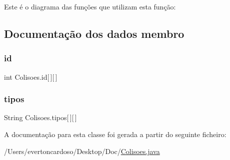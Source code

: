 Este é o diagrama das funções que utilizam esta função\+:


\subsection{Documentação dos dados membro}
\mbox{\label{class_colisoes_a24e82ed4cd735cdf7adc0e1dfe1da0d4}} 
\subsubsection{\texorpdfstring{id}{id}}
{\footnotesize\ttfamily int Colisoes.\+id\mbox{[}$\,$\mbox{]}\mbox{[}$\,$\mbox{]}\hspace{0.3cm}{\ttfamily [protected]}}

\mbox{\label{class_colisoes_a44a61dfac2eac26a202bc861c07b3b04}} 
\subsubsection{\texorpdfstring{tipos}{tipos}}
{\footnotesize\ttfamily String Colisoes.\+tipos\mbox{[}$\,$\mbox{]}\mbox{[}$\,$\mbox{]}\hspace{0.3cm}{\ttfamily [protected]}}



A documentação para esta classe foi gerada a partir do seguinte ficheiro\+:\begin{DoxyCompactItemize}
\item 
/\+Users/evertoncardoso/\+Desktop/\+Doc/\mbox{\hyperlink{_colisoes_8java}{Colisoes.\+java}}\end{DoxyCompactItemize}
